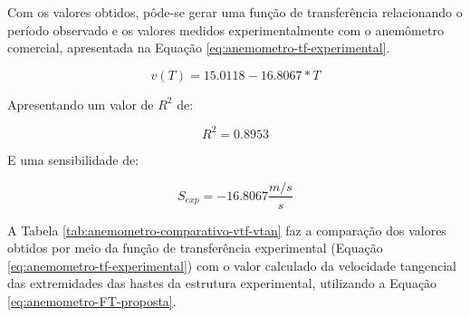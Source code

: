\documentclass[a4paper]{instrumentacao}
\begin{document}
Com os valores obtidos, pôde-se gerar uma função de transferência relacionando o período observado e os valores medidos experimentalmente com o anemômetro comercial, apresentada na Equação \ref{eq:anemometro-tf-experimental}.

\begin{equation}
	v(T)=15.0118-16.8067*T
	\label{eq:anemometro-tf-experimental}
\end{equation}

Apresentando um valor de $R^2$ de:

\begin{equation}
	R^2=0.8953
	\label{eq:anemometro-r2-tf-experimental}
\end{equation}

E uma sensibilidade de:

\begin{equation}
	S_{exp}=-16.8067\frac{m/s}{s}
	\label{eq:anemometro-sensibilidade-experimental}
\end{equation}

A Tabela \ref{tab:anemometro-comparativo-vtf-vtan} faz a comparação dos valores obtidos por meio da função de transferência experimental (Equação \ref{eq:anemometro-tf-experimental}) com o valor calculado da velocidade tangencial das extremidades das hastes da estrutura experimental, utilizando a Equação \ref{eq:anemometro-FT-proposta}.
\end{document}
